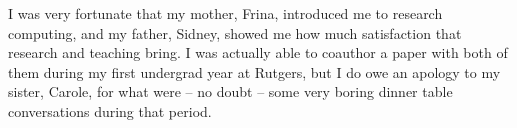 I was very fortunate that my mother, Frina, introduced me to research computing, and my father, Sidney, showed me how much satisfaction that research and teaching bring. I was actually able to coauthor a paper with both of them during my first undergrad year at Rutgers, but I do owe an apology to my sister, Carole, for what were -- no doubt -- some very boring dinner table conversations during that period.